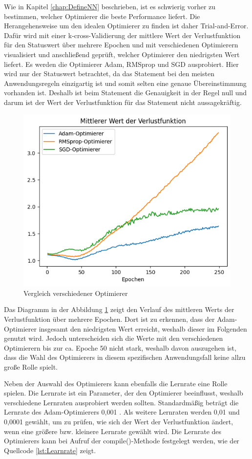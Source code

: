 Wie in Kapitel \ref*{chap:DefineNN} beschrieben, ist es schwierig vorher zu bestimmen, welcher Optimierer die beste Performance liefert. Die Herangehensweise
um den idealen Optimierer zu finden ist daher Trial-and-Error. Dafür wird mit einer k-cross-Validierung der mittlere Wert der Verlustfunktion für den Statuswert
über mehrere Epochen und mit verschiedenen Optimierern visualisiert und anschließend geprüft, welcher Optimierer den niedrigsten Wert liefert. Es werden die Optimierer 
\glqq Adam\grqq{}, \glqq RMSprop\grqq{} und \glqq SGD\grqq{} ausprobiert.
Hier wird nur der Statuswert betrachtet, da das Statement bei den meisten Anwendungsregeln einzigartig ist und somit selten eine genaue Übereinstimmung vorhanden ist.
Deshalb ist beim Statement die Genauigkeit in der Regel null und darum ist der Wert der Verlustfunktion für das Statement nicht aussagekräftig.

\begin{figure}[H]
    \centering
    \includegraphics[width=.75\textwidth]{abbildungen/Optimierer/LossOptimierer.png}
    \caption{Vergleich verschiedener Optimierer}
    \label{fig:LossOptimierer}
\end{figure}

Das Diagramm in der Abbildung \ref*{fig:LossOptimierer} zeigt den Verlauf des mittleren Werts der Verlustfunktion über mehrere Epochen. Dort ist zu erkennen, dass 
der Adam-Optimierer insgesamt den niedrigsten Wert erreicht, weshalb dieser im Folgenden genutzt wird. Jedoch
unterscheiden sich die Werte mit den verschiedenen Optimierern bis zur ca. Epoche 50 nicht stark, weshalb davon auszugehen ist, dass die Wahl des Optimierers in diesem spezifischen
Anwendungsfall keine allzu große Rolle spielt.

Neben der Auswahl des Optimierers kann ebenfalls die Lernrate eine Rolle spielen. Die Lernrate ist ein Parameter, der den Optimierer beeinflusst, weshalb verschiedene Lernraten ausprobiert werden
sollten. Standardmäßig beträgt die Lernrate des Adam-Optimierers 0,001 \cite{KerasDoc}. Als weitere Lernraten werden 0,01 und 0,0001 gewählt, um zu prüfen, wie 
sich der Wert der Verlustfunktion ändert, wenn eine größere bzw. kleinere Lernrate gewählt wird.
Die Lernrate des Optimierers kann bei Aufruf der compile()-Methode festgelegt werden, wie der Quellcode \ref*{lst:Learnrate} zeigt.

